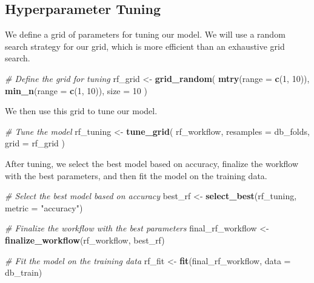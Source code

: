 \documentclass[
]{book}
\newenvironment{Shaded}{\begin{snugshade}}{\end{snugshade}}
\newcommand{\AttributeTok}[1]{\textcolor[rgb]{0.13,0.29,0.53}{#1}}
\newcommand{\CommentTok}[1]{\textcolor[rgb]{0.56,0.35,0.01}{\textit{#1}}}
\newcommand{\DecValTok}[1]{\textcolor[rgb]{0.00,0.00,0.81}{#1}}
\newcommand{\FunctionTok}[1]{\textcolor[rgb]{0.13,0.29,0.53}{\textbf{#1}}}
\newcommand{\NormalTok}[1]{#1}
\newcommand{\OtherTok}[1]{\textcolor[rgb]{0.56,0.35,0.01}{#1}}
\newcommand{\StringTok}[1]{\textcolor[rgb]{0.31,0.60,0.02}{#1}}
\begin{document}
\hypertarget{hyperparameter-tuning}{%
\subsection{Hyperparameter Tuning}\label{hyperparameter-tuning}}

We define a grid of parameters for tuning our model. We will use a random search strategy for our grid, which is more efficient than an exhaustive grid search.

\begin{Shaded}
\begin{Highlighting}[]
\CommentTok{\# Define the grid for tuning}
\NormalTok{rf\_grid }\OtherTok{\textless{}{-}} \FunctionTok{grid\_random}\NormalTok{(}
  \FunctionTok{mtry}\NormalTok{(}\AttributeTok{range =} \FunctionTok{c}\NormalTok{(}\DecValTok{1}\NormalTok{, }\DecValTok{10}\NormalTok{)), }
  \FunctionTok{min\_n}\NormalTok{(}\AttributeTok{range =} \FunctionTok{c}\NormalTok{(}\DecValTok{1}\NormalTok{, }\DecValTok{10}\NormalTok{)), }
  \AttributeTok{size =} \DecValTok{10}
\NormalTok{)}
\end{Highlighting}
\end{Shaded}

We then use this grid to tune our model.

\begin{Shaded}
\begin{Highlighting}[]
\CommentTok{\# Tune the model}
\NormalTok{rf\_tuning }\OtherTok{\textless{}{-}} \FunctionTok{tune\_grid}\NormalTok{(}
\NormalTok{  rf\_workflow,}
  \AttributeTok{resamples =}\NormalTok{ db\_folds,}
  \AttributeTok{grid =}\NormalTok{ rf\_grid}
\NormalTok{)}
\end{Highlighting}
\end{Shaded}

After tuning, we select the best model based on accuracy, finalize the workflow with the best parameters, and then fit the model on the training data.

\begin{Shaded}
\begin{Highlighting}[]
\CommentTok{\# Select the best model based on accuracy}
\NormalTok{best\_rf }\OtherTok{\textless{}{-}} \FunctionTok{select\_best}\NormalTok{(rf\_tuning, }\AttributeTok{metric =} \StringTok{"accuracy"}\NormalTok{)}

\CommentTok{\# Finalize the workflow with the best parameters}
\NormalTok{final\_rf\_workflow }\OtherTok{\textless{}{-}} \FunctionTok{finalize\_workflow}\NormalTok{(rf\_workflow, best\_rf)}

\CommentTok{\# Fit the model on the training data}
\NormalTok{rf\_fit }\OtherTok{\textless{}{-}} \FunctionTok{fit}\NormalTok{(final\_rf\_workflow, }\AttributeTok{data =}\NormalTok{ db\_train)}
\end{Highlighting}
\end{Shaded}
\end{document}
